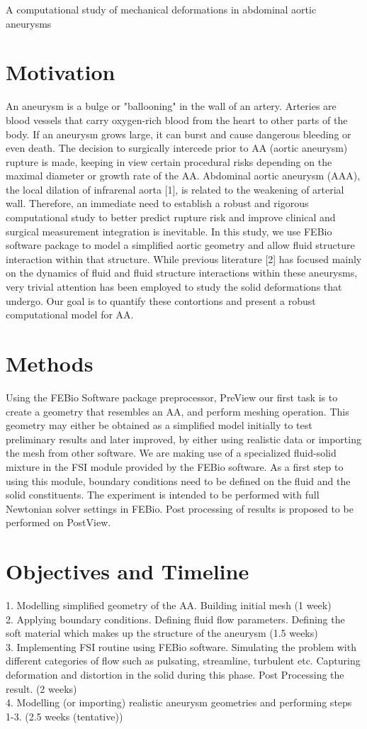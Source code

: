 \documentclass[11pt]{article}
\newcommand{\soptitle}{A computational study of mechanical deformations in abdominal aortic aneurysms}
\begin{document}
	
	\begin{center}
		\Large\soptitle
	\end{center}
	
	\section*{Motivation}
	An aneurysm is a bulge or "ballooning" in the wall of an artery. Arteries are blood vessels that carry oxygen-rich blood from the heart to other parts of the body. If an aneurysm grows large, it can burst and cause dangerous bleeding or even death. The decision to surgically intercede prior to AA (aortic aneurysm) rupture is made, keeping in view certain procedural risks depending on the maximal diameter or growth rate of the AA. Abdominal aortic aneurysm (AAA), the local dilation of infrarenal aorta [1], is related to the weakening of arterial wall. Therefore, an immediate need to establish a robust and rigorous computational study to better predict rupture risk and improve clinical and surgical measurement integration is inevitable. In this study, we use FEBio software package to model a simplified aortic geometry and allow fluid structure interaction within that structure. While previous literature [2] has focused mainly on the dynamics of fluid and fluid structure interactions within these aneurysms, very trivial attention has been employed to study the solid deformations that undergo. Our goal is to quantify these contortions and present a robust computational model for AA. 
	\section*{Methods}
	Using the FEBio Software package preprocessor, PreView our first task is to create a geometry that resembles an AA, and perform meshing operation. This geometry may either be obtained as a simplified model initially to test preliminary results and later improved, by either using realistic data or importing the mesh from other software. We are making use of a specialized fluid-solid mixture in the FSI module provided by the FEBio software. As a first step to using this module, boundary conditions need to be defined on the fluid and the solid constituents. The experiment is intended to be performed with full Newtonian solver settings in FEBio. Post processing of results is proposed to be performed on PostView. 
	\section*{Objectives and Timeline}
	1.	Modelling simplified geometry of the AA. Building initial mesh (1 week) \\
	2.	Applying boundary conditions. Defining fluid flow parameters. Defining the soft material which makes up the structure of the aneurysm (1.5 weeks)\\
	3.	Implementing FSI routine using FEBio software. Simulating the problem with different categories of flow such as pulsating, streamline, turbulent etc.  Capturing deformation and distortion in the solid during this phase. Post Processing the result. (2 weeks)\\
	4.	Modelling (or importing) realistic aneurysm geometries and performing steps 1-3. (2.5 weeks (tentative))
\end{document}
